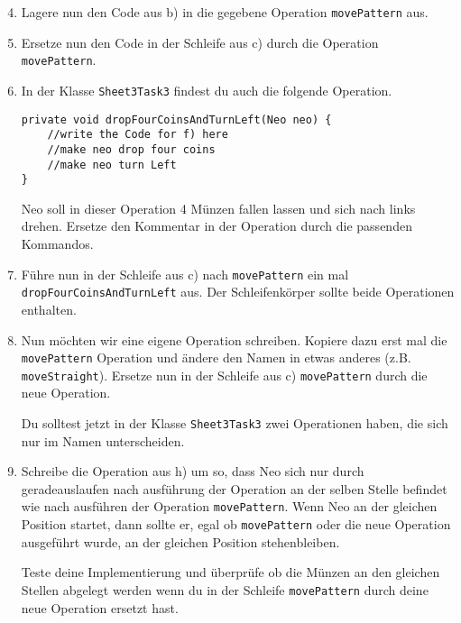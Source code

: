 \begin{enumerate}\setcounter{enumi}{3}
	\item 
		Lagere nun den Code aus b) in die gegebene Operation \lstinline{movePattern} aus.

	\item
		Ersetze nun den Code in der Schleife aus c) durch die Operation \lstinline{movePattern}.

	\item
		In der Klasse \lstinline{Sheet3Task3} findest du auch die folgende Operation.

		\begin{lstlisting}
private void dropFourCoinsAndTurnLeft(Neo neo) {
    //write the Code for f) here
    //make neo drop four coins
    //make neo turn Left
}
		\end{lstlisting}

		Neo soll in dieser Operation 4 Münzen fallen lassen und sich nach links drehen. 
		Ersetze den Kommentar in der Operation durch die passenden Kommandos.

	\item
		Führe nun in der Schleife aus c) nach \lstinline{movePattern} ein mal \lstinline{dropFourCoinsAndTurnLeft} aus.
		Der Schleifenkörper sollte beide Operationen enthalten.

	\item
		Nun möchten wir eine eigene Operation schreiben. 
		Kopiere dazu erst mal die \lstinline{movePattern} Operation und ändere den Namen in etwas anderes (z.B. \lstinline{moveStraight}).
		Ersetze nun in der Schleife aus c) \lstinline{movePattern} durch die neue Operation.

		Du solltest jetzt in der Klasse \lstinline{Sheet3Task3} zwei Operationen haben, die sich nur im Namen unterscheiden.

	\item
		Schreibe die Operation aus h) um so, dass Neo sich nur durch geradeauslaufen nach ausführung der Operation an der selben Stelle befindet wie nach ausführen der Operation \lstinline{movePattern}.
		Wenn Neo an der gleichen Position startet, dann sollte er, egal ob \lstinline{movePattern} oder die neue Operation ausgeführt wurde, an der gleichen Position stehenbleiben.

		Teste deine Implementierung und überprüfe ob die Münzen an den gleichen Stellen abgelegt werden wenn du in der Schleife \lstinline{movePattern} durch deine neue Operation ersetzt hast.
\end{enumerate}
\newpage
